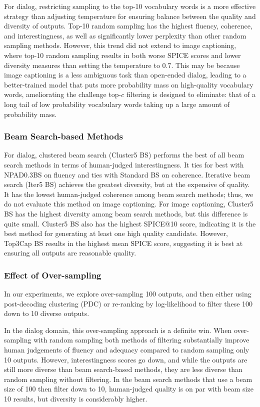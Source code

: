 For dialog, restricting sampling to the top-10 vocabulary words is a more effective strategy than adjusting temperature for ensuring balance between the quality and diversity of outputs.
Top-10 random sampling has the highest fluency, coherence, and interestingness, as well as significantly lower perplexity than other random sampling methods.
However, this trend did not extend to image captioning, where top-10 random sampling results in both worse SPICE scores and lower diversity measures than setting the temperature to 0.7.
This may be because image captioning is a less ambiguous task than open-ended dialog, leading to a better-trained model that puts more probability mass on high-quality vocabulary words, ameliorating the challenge top-$c$ filtering is designed to eliminate: that of a long tail of low probability vocabulary words taking up a large amount of probability mass.

\subsubsection{Beam Search-based Methods}

For dialog, clustered beam search (Cluster5 BS) performs the best of all beam search methods in terms of human-judged interestingness. It ties for best with NPAD0.3BS on fluency and ties with Standard BS on coherence.
Iterative beam search (Iter5 BS) achieves the greatest diversity, but at the expensive of quality.
It has the lowest human-judged coherence among beam search methods; thus, we do not evaluate this method on image captioning.
For image captioning, Cluster5 BS has the highest diversity among beam search methods, but this difference is quite small.
Cluster5 BS also has the highest SPICE@10 score, indicating it is the best method for generating at least one high quality candidate.
However, Top3Cap BS results in the highest mean SPICE score, suggesting it is best at ensuring all outputs are reasonable quality.

\subsubsection{Effect of Over-sampling}

In our experiments, we explore over-sampling 100 outputs, and then either using post-decoding clustering (PDC) or re-ranking by log-likelihood to filter these 100 down to 10 diverse outputs.

In the dialog domain, this over-sampling approach is a definite win.
When over-sampling with random sampling both methods of filtering substantially improve human judgements of fluency and adequacy compared to random sampling only 10 outputs.
However, interestingness scores go down, and while the outputs are still more diverse than beam search-based methods, they are less diverse than random sampling without filtering.
In the beam search methods that use a beam size of 100 then filter down to 10, human-judged quality is on par with beam size 10 results, but diversity is considerably higher.

